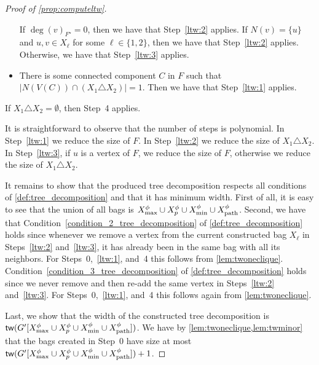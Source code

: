 \documentclass[a4paper,UKenglish,cleveref, autoref, thm-restate, numberwithinsect]{lipics-v2021}
\newcommand{\tw}{\mathsf{tw}}
\newcommand{\dpath}{\textup{path}}
\begin{document}
\begin{proof}[Proof of \cref{prop:computeltw}]
\begin{itemize}
If $\deg(v)_{F^\star}=0$, then we have that Step~\ref{ltw:2} applies.
If $N(v)=\{u\}$ and $u,v\in X_\ell$ for some $\ell\in\{1,2\}$, then we have that Step~\ref{ltw:2} applies.
Otherwise, we have that Step~\ref{ltw:3} applies.
\item There is some connected component $C$ in $F$ such that $|N(V(C))\cap (X_1\triangle X_2)|=1$.
Then we have that Step~\ref{ltw:1} applies.
\end{itemize}
If $X_1\triangle X_2=\emptyset$, then Step~4 applies.

It is straightforward to observe that the number of steps is polynomial. In Step~\ref{ltw:1} we reduce the size of $F$. In Step~\ref{ltw:2} we reduce the size of $X_1\triangle X_2$. In Step~\ref{ltw:3}, if $u$ is a vertex of $F$, we reduce the size of $F$, otherwise we reduce the size of $X_1\triangle X_2$.

It remains to show that the produced tree decomposition respects all conditions of \cref{def:tree_decomposition} and that it has minimum width. First of all, it is easy to see that the union of all bags is $X^\phi_{\max}\cup X^\phi_p\cup X^\phi_{\min}\cup X^\phi_{\dpath}$. Second, we have that Condition~\ref{condition_2_tree_decomposition} of \cref{def:tree_decomposition} holds since whenever we remove a vertex from the current constructed bag $X_\ell$ in Steps~\ref{ltw:2} and~\ref{ltw:3}, it has already been in the same bag with all its neighbors. For Steps~0,~\ref{ltw:1}, and~4 this follows from \cref{lem:twoneclique}. 
Condition~\ref{condition_3_tree_decomposition} of \cref{def:tree_decomposition} holds since we never remove and then re-add the same vertex in Steps~\ref{ltw:2} and~\ref{ltw:3}. For Steps~0,~\ref{ltw:1}, and~4 this follows again from \cref{lem:twoneclique}.

Last, we show that the width of the constructed tree decomposition is $\tw(G'[X^\phi_{\max}\cup X^\phi_p\cup X^\phi_{\min}\cup X^\phi_{\dpath}])$. 
We have by \cref{lem:twoneclique,lem:twminor} that the bags created in Step~0 have size at most $\tw(G'[X^\phi_{\max}\cup X^\phi_p\cup X^\phi_{\min}\cup X^\phi_{\dpath}])+1$.


\end{proof}
\end{document}
